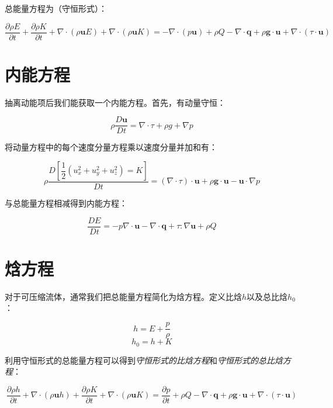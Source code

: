 总能量方程为（守恒形式）：

\begin{equation}
\frac{\partial\rho E}{\partial t} + \frac{\partial\rho K}{\partial t} + \nabla\cdot(\rho\bm{u}E) + \nabla\cdot(\rho\bm{u}K) = -\nabla\cdot(p\bm{u}) + \rho Q - \nabla\cdot\bm{q} + \rho\bm{g}\cdot\bm{u} + \nabla\cdot(\tau\cdot\bm{u})
\end{equation}

\section{内能方程}

抽离动能项后我们能获取一个内能方程。首先，有动量守恒：

\begin{equation}
\rho \frac{D\mathbf{u}}{Dt} = \nabla\cdot\tau + \rho g + \nabla p
\end{equation}

将动量方程中的每个速度分量方程乘以速度分量并加和有：

\begin{equation}
\rho \frac{D \left[\dfrac{1}{2}\left(u_x^2+u_y^2+u_z^2 \right)= K\right]}{Dt}
=\left(\nabla \cdot \tau \right) \cdot \mathbf{u} + \rho \mathbf{g} \cdot \mathbf{u} -\mathbf{u} \cdot \nabla p
\end{equation}

与总能量方程相减得到内能方程：

\begin{equation}
\frac{DE}{Dt}
=-p\nabla \cdot \mathbf{u}-\nabla\cdot \mathbf{q} + \tau : \nabla \mathbf{u} + \rho Q
\end{equation}

\section{焓方程}

对于可压缩流体，通常我们把总能量方程简化为焓方程。定义比焓$ h $以及总比焓$ h_0 $：

\[ h = E+\frac{p}{\rho} \]
\[ h_0 = h+K \]

利用守恒形式的总能量方程可以得到\textit{守恒形式的比焓方程}和\textit{守恒形式的总比焓方程}：

\begin{equation}
\frac{\partial \rho h}{\partial t}+\nabla \cdot (\rho \mathbf{u} h) + \frac{\partial \rho K}{\partial t}+\nabla \cdot (\rho \mathbf{u} K) =\frac{\partial p}{\partial t}+ \rho Q - \nabla \cdot \mathbf{q} + \rho \mathbf{g} \cdot \mathbf{u}+\nabla \cdot(\tau \cdot \mathbf{u})
\end{equation}

